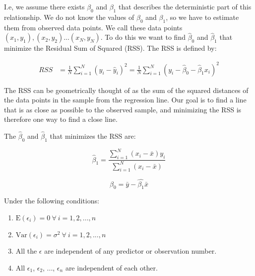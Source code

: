 \documentclass{article}
\begin{document}
I.e, we assume there exists \(\beta_0\) and \(\beta_1\) that describes the
deterministic part of this relationship.
We do not know the values of \(\beta_0\) and \(\beta_1\), so we have to estimate them from observed data points. We call these data points \((x_1, y_1), (x_2, y_2)
... (x_N, y_N)\). To do
this we want to find \(\hat{\beta}_0\) and \(\hat{\beta}_1\) that minimize the
Residual Sum of Squared (RSS). The RSS is defined by:

\begin{align*}
  RSS &= \frac{1}{N} \sum_{i = 1}^N \left( y_i - \hat{y}_i \right)^2 
  = \frac{1}{N} \sum_{i = 1}^N \left( y_i - \hat{\beta}_0 - \hat{\beta}_1 x_i \right)^2
\end{align*}

The RSS can be geometrically thought of as the sum of the squared distances of
the data points in the sample from the regression line. Our goal is to find a
line that is as close as possible to the observed sample, and minimizing the RSS
is therefore one way to find a close line.

The \(\hat{\beta}_0\) and \(\hat{\beta}_1\) that minimizes the RSS are:

\begin{equation*}
 \hat{\beta}_1 = \frac{\sum_{i = 1}^N\left( x_i - \bar{x} \right) y_i}{\sum_{i = 1}^N\left( x_i - \bar{x} \right)} 
\end{equation*}

\begin{equation*}
 \hat{\beta}_0 = \bar{y} - \hat{\beta_1}\bar{x} 
\end{equation*}

Under the following conditions:

\begin{enumerate}
\item \(\mathrm{E} \left( \epsilon_i \right) = 0\ \forall \ i = 1, 2, ..., n\)
\item \(\mathrm{Var} \left( \epsilon_i \right) = \sigma^2\ \forall \ i = 1, 2, ..., n\)
\item All the \(\epsilon\) are independent of any predictor or observation number.
\item All \(\epsilon_1\), \(\epsilon_2\), ..., \(\epsilon_n\) are independent of each other.
\end{enumerate}
\end{document}
